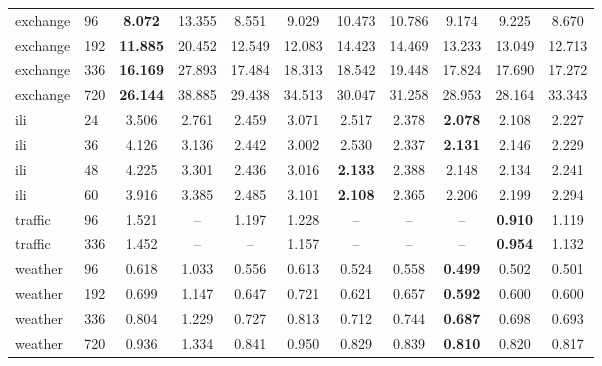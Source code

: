 \begin{tabular}{llccccccccc}
exchange & 96 & \textbf{8.072} & 13.355 & 8.551 & 9.029 & 10.473 & 10.786 & 9.174 & 9.225 & 8.670 \\
exchange & 192 & \textbf{11.885} & 20.452 & 12.549 & 12.083 & 14.423 & 14.469 & 13.233 & 13.049 & 12.713 \\
exchange & 336 & \textbf{16.169} & 27.893 & 17.484 & 18.313 & 18.542 & 19.448 & 17.824 & 17.690 & 17.272 \\
exchange & 720 & \textbf{26.144} & 38.885 & 29.438 & 34.513 & 30.047 & 31.258 & 28.953 & 28.164 & 33.343 \\
ili & 24 & 3.506 & 2.761 & 2.459 & 3.071 & 2.517 & 2.378 & \textbf{2.078} & 2.108 & 2.227 \\
ili & 36 & 4.126 & 3.136 & 2.442 & 3.002 & 2.530 & 2.337 & \textbf{2.131} & 2.146 & 2.229 \\
ili & 48 & 4.225 & 3.301 & 2.436 & 3.016 & \textbf{2.133} & 2.388 & 2.148 & 2.134 & 2.241 \\
ili & 60 & 3.916 & 3.385 & 2.485 & 3.101 & \textbf{2.108} & 2.365 & 2.206 & 2.199 & 2.294 \\
traffic & 96 & 1.521 & -- & 1.197 & 1.228 & -- & -- & -- & \textbf{0.910} & 1.119 \\
traffic & 336 & 1.452 & -- & -- & 1.157 & -- & -- & -- & \textbf{0.954} & 1.132 \\
weather & 96 & 0.618 & 1.033 & 0.556 & 0.613 & 0.524 & 0.558 & \textbf{0.499} & 0.502 & 0.501 \\
weather & 192 & 0.699 & 1.147 & 0.647 & 0.721 & 0.621 & 0.657 & \textbf{0.592} & 0.600 & 0.600 \\
weather & 336 & 0.804 & 1.229 & 0.727 & 0.813 & 0.712 & 0.744 & \textbf{0.687} & 0.698 & 0.693 \\
weather & 720 & 0.936 & 1.334 & 0.841 & 0.950 & 0.829 & 0.839 & \textbf{0.810} & 0.820 & 0.817 \\
\bottomrule
\end{tabular}